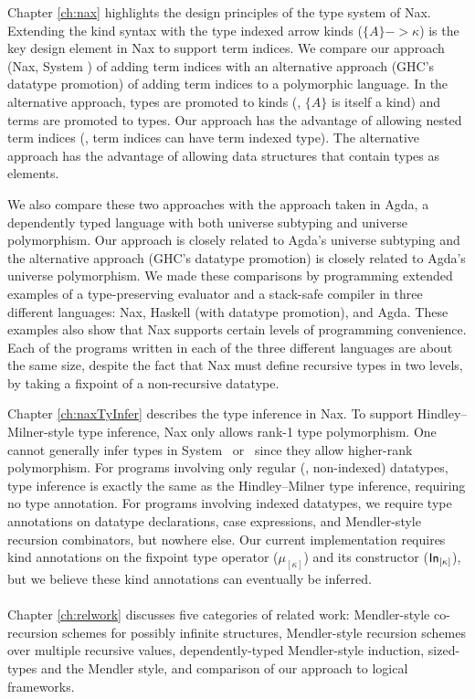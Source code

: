 Chapter \ref{ch:nax} highlights the design principles of the type system of Nax.
Extending the kind syntax with the type indexed arrow kinds ($\{A\} -> \kappa$) 
is the key design element in Nax to support term indices.
We compare our approach (Nax, System \Fi) of adding term indices with
an alternative approach (GHC's datatype promotion) of adding
term indices to a polymorphic language. In the alternative approach,
types are promoted to kinds (\ie, $\{A\}$ is itself a kind) and
terms are promoted to types. Our approach has the advantage of
allowing nested term indices (\ie, term indices can have term indexed type).
The alternative approach has the advantage of allowing data structures that
contain types as elements.

We also compare these two approaches with the approach taken in Agda,
a dependently typed language with both universe subtyping and
universe polymorphism. Our approach is closely related to
Agda's universe subtyping and the alternative approach
(GHC's datatype promotion) is closely related to Agda's universe polymorphism.
We made these comparisons by programming extended examples of
a type-preserving evaluator and a stack-safe compiler
in three different languages: Nax, Haskell (with datatype promotion), and Agda.
These examples also show that Nax supports certain levels of
programming convenience. Each of the programs written
in each of the three different languages are about the same size,
despite the fact that Nax must define recursive types in two levels,
by taking a fixpoint of a non-recursive datatype.

Chapter \ref{ch:naxTyInfer} describes the type inference in Nax.
To support Hindley--Milner-style type inference, Nax only
allows rank-1 type polymorphism. One cannot generally infer types
in System \Fi\ or \Fixi\ since they allow higher-rank polymorphism.
For programs involving only regular (\ie, non-indexed) datatypes,
type inference is exactly the same as the Hindley--Milner type inference,
requiring no type annotation. For programs involving indexed datatypes,
we require type annotations on datatype declarations, case expressions, and
Mendler-style recursion combinators, but nowhere else.
Our current implementation requires kind annotations on
the fixpoint type operator ($\mu_{[\kappa]}$) and its constructor
($\mathsf{In}_{[\kappa]}$), but we believe these kind annotations can eventually be inferred.

\paragraph{}
Chapter \ref{ch:relwork} discusses five categories of related work:
Mendler-style co-recursion schemes for possibly infinite structures,
Mendler-style recursion schemes over multiple recursive values,
dependently-typed Mendler-style induction, sized-types and the Mendler style,
and comparison of our approach to logical frameworks.


